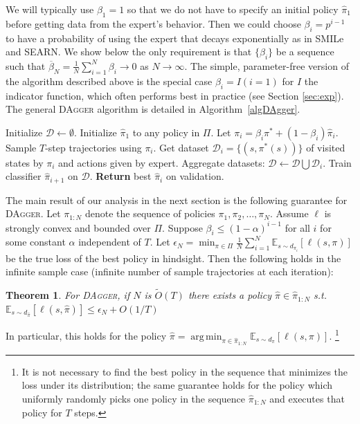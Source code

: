 \documentclass[twoside]{article}
\newtheorem{theorem}{Theorem}[section]
\DeclareMathOperator*{\argmin}{arg\,min}
\begin{document}
We will typically use $\beta_1 = 1$ so that we do not have to specify an initial policy $\hat{\pi}_1$ before getting data from the expert's behavior. Then we could choose $\beta_i = p^{i-1}$ to have a probability of using the expert that decays exponentially as in SMILe and SEARN. We show below the only requirement is that $\{ \beta_i \}$ be a sequence such that $\overline{\beta}_N = \frac{1}{N}\sum_{i=1}^N \beta_i \rightarrow 0$ as $N \rightarrow \infty$. The simple, parameter-free version of the algorithm described above is the special case $\beta_i = I(i=1)$ for $I$ the indicator function, which often performs best in practice (see Section \ref{sec:exp}). The general \textsc{DAgger} algorithm is detailed in Algorithm~\ref{algDAgger}.
%
\begin{algorithm}
\begin{algorithmic}
\STATE Initialize $\mathcal{D} \leftarrow \emptyset$.
\STATE Initialize $\hat{\pi}_1$ to any policy in $\Pi$.
\STATE Let $\pi_i = \beta_i \pi^* + (1-\beta_i) \hat{\pi}_{i}$.
\STATE Sample $T$-step trajectories using $\pi_i$.
\STATE Get dataset $\mathcal{D}_i = \{ (s, \pi^*(s)) \}$ of visited states by $\pi_i$ and actions given by expert.
\STATE Aggregate datasets: $\mathcal{D} \leftarrow \mathcal{D} \bigcup \mathcal{D}_i$.
\STATE Train classifier $\hat{\pi}_{i+1}$ on $\mathcal{D}$.
\ENDFOR
\STATE \textbf{Return} best $\hat{\pi}_i$ on validation.
\end{algorithmic}
\caption{\textsc{DAgger} Algorithm. \label{algDAgger}}
\end{algorithm}
%
The main result of our analysis in the next section is the following guarantee for \textsc{DAgger}. Let $\pi_{1:N}$ denote the sequence of policies $\pi_1, \pi_2, \dots, \pi_N$. Assume $\ell$ is strongly convex and bounded over $\Pi$. Suppose $\beta_i \leq (1-\alpha)^{i-1}$ for all $i$ for some constant $\alpha$ independent of $T$. Let $\epsilon_N = \min_{\pi \in \Pi} \frac{1}{N} \sum_{i=1}^N \mathbb{E}_{s \sim d_{\pi_i}}[ \ell(s,\pi) ]$ be the true loss of the best policy in hindsight. Then the following holds in the infinite sample case (infinite number of sample trajectories at each iteration):
\begin{theorem}\label{thmDagger}
For \textsc{DAgger}, if $N$ is $\tilde{O}(T)$ there exists a policy $\hat{\pi} \in \hat{\pi}_{1:N}$ s.t. $\mathbb{E}_{s \sim d_{\hat{\pi}}}[ \ell(s,\hat{\pi}) ] \leq \epsilon_N + O(1/T)$
\end{theorem}
%
In particular, this holds for the policy $\hat{\pi} = \argmin_{\pi \in \hat{\pi}_{1:N}} \mathbb{E}_{s \sim d_{\pi}}[ \ell(s,\pi) ]$. \footnote{It is not necessary to find the best policy in the sequence that minimizes the loss under its distribution; the same guarantee holds for the policy which uniformly randomly picks one policy in the sequence $\hat{\pi}_{1:N}$ and executes that policy for $T$ steps.}
\end{document}
